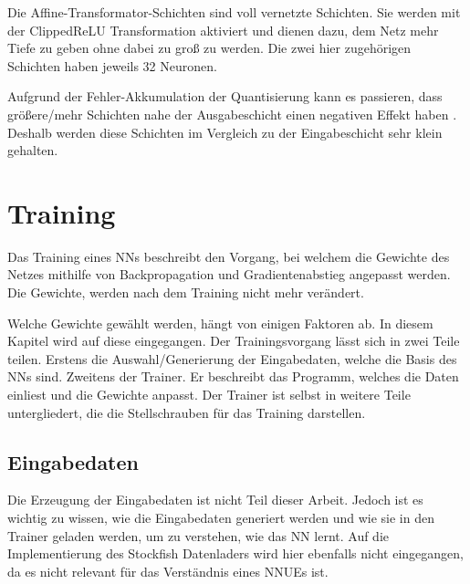 Die Affine-Transformator-Schichten sind voll vernetzte Schichten. Sie werden mit der Clipped\ac{ReLU} Transformation aktiviert und dienen dazu, dem Netz mehr Tiefe zu geben ohne dabei zu groß zu werden. Die zwei hier zugehörigen Schichten haben jeweils 32 Neuronen.

Aufgrund der Fehler-Akkumulation der Quantisierung kann es passieren, dass größere/mehr Schichten nahe der Ausgabeschicht einen negativen Effekt haben \cite{StockfishNNUE}. Deshalb werden diese Schichten im Vergleich zu der Eingabeschicht sehr klein gehalten.

\section{Training}
\label{chap:trainiung}

Das Training eines \acp{NN} beschreibt den Vorgang, bei welchem die Gewichte des Netzes mithilfe von Backpropagation und Gradientenabstieg angepasst werden. Die Gewichte, werden nach dem Training nicht mehr verändert.

Welche Gewichte gewählt werden, hängt von einigen Faktoren ab. In diesem Kapitel wird auf diese eingegangen. Der Trainingsvorgang lässt sich in zwei Teile teilen. Erstens die Auswahl/Generierung der Eingabedaten, welche die Basis des \acp{NN} sind. Zweitens der Trainer. Er beschreibt das Programm, welches die Daten einliest und die Gewichte anpasst. Der Trainer ist selbst in weitere Teile untergliedert, die die Stellschrauben für das Training darstellen.

\subsection{Eingabedaten}
\label{chap:inputdata}

Die Erzeugung der Eingabedaten ist nicht Teil dieser Arbeit. Jedoch ist es wichtig zu wissen, wie die Eingabedaten generiert werden und wie sie in den Trainer geladen werden, um zu verstehen, wie das \ac{NN} lernt. Auf die Implementierung des Stockfish Datenladers wird hier ebenfalls nicht eingegangen, da es nicht relevant für das Verständnis eines \acp{NNUE} ist.

